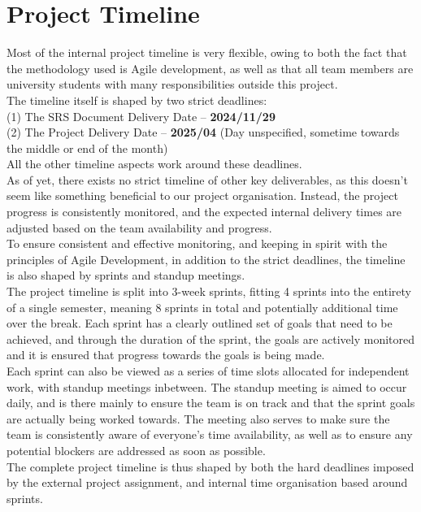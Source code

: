 \section{Project Timeline}

Most of the internal project timeline is very flexible, owing to both the fact that the methodology used is Agile development, 
as well as that all team members are university students with many responsibilities outside this project. \\

The timeline itself is shaped by two strict deadlines: \\
(1) The SRS Document Delivery Date -- \textbf{2024/11/29} \\
(2) The Project Delivery Date -- \textbf{2025/04} (Day unspecified, sometime towards the middle or end of the month) \\

All the other timeline aspects work around these deadlines. \\

As of yet, there exists no strict timeline of other key deliverables, as this doesn't seem like something beneficial to our project organisation.
Instead, the project progress is consistently monitored, and the expected internal delivery times are adjusted based on the team availability and progress. \\

To ensure consistent and effective monitoring, and keeping in spirit with the principles of Agile Development, in addition to the strict deadlines, the timeline is also shaped by sprints and standup meetings. \\

The project timeline is split into 3-week sprints, fitting 4 sprints into the entirety of a single semester, meaning 8 sprints in total and potentially additional time over the break.
Each sprint has a clearly outlined set of goals that need to be achieved, and through the duration of the sprint, the goals are actively monitored and it is ensured that progress towards the goals is being made. \\

Each sprint can also be viewed as a series of time slots allocated for independent work, with standup meetings inbetween.
The standup meeting is aimed to occur daily, and is there mainly to ensure the team is on track and that the sprint goals are actually being worked towards.
The meeting also serves to make sure the team is consistently aware of everyone's time availability, as well as to ensure any potential blockers are addressed as soon as possible. \\

The complete project timeline is thus shaped by both the hard deadlines imposed by the external project assignment, and internal time organisation based around sprints.

